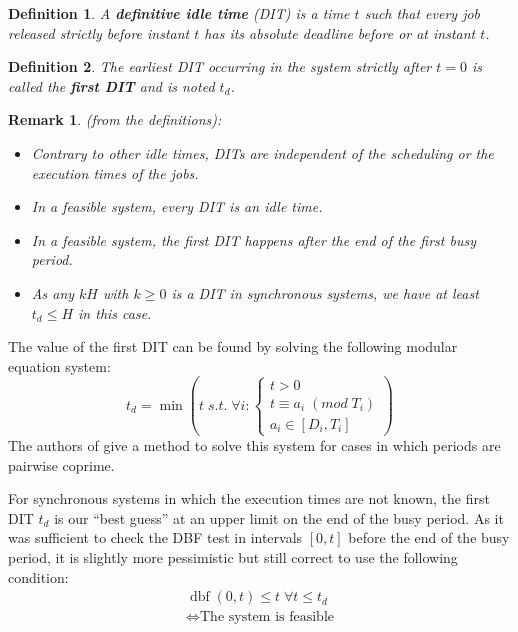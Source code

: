 \documentclass[conference]{IEEEtran}
\newtheorem{definition}{Definition}
\newtheorem{remark}{Remark}
\newcommand{\dbf}[1]{\operatorname{dbf}(#1)}
\begin{document}
  \begin{definition}
    A \textbf{definitive idle time} (DIT) is a time $t$ such that every job
    released strictly before instant $t$ has its absolute deadline before or at instant $t$.
  \end{definition}

  \begin{definition}
    The earliest DIT occurring in the system strictly after $t=0$ is called the
    \textbf{first DIT} and is noted $t_d$.
  \end{definition}

  \begin{remark} (from the definitions):
    \begin{itemize}
      \item Contrary to other idle times, DITs are independent of the
      scheduling or the execution times of the jobs.
      \item In a feasible system, every DIT is an idle time.
      \item In a feasible system, the first DIT happens after the end of the
      first busy period.
      \item As any $kH$ with $k \geqslant 0$ is a DIT in synchronous systems, we have at least $t_d
      \leqslant H$ in this case.
    \end{itemize}
  \end{remark}

  The value of the first DIT can be found by solving the following modular equation system:
  \[
    t_d = \min
    \left( t \; s.t. \; \forall i:
      \left\{
        \begin{array}{c}
          t > 0 \\
          t \equiv a_i \; (mod \; T_i) \\
          a_i \in [D_i, T_i]
        \end{array}
      \right.
    \right)
  \]
  The authors of \cite{george2009characterization} give a method to solve this system for cases in which periods are pairwise coprime.

  For synchronous systems in which the execution times are not known, the first DIT $t_d$
  is our ``best guess'' at an upper limit on the end of the busy period. As it was sufficient
  to check the DBF test in intervals $[0, t]$ before the end of the busy period, it is
  slightly more pessimistic but still correct to use the following condition:
  \[
  	\begin{array}{c}
  		\dbf{0,t} \leqslant t \; \forall t \leqslant t_d \\
  		\iff \text{The system is feasible}
  	\end{array}
  \]
\end{document}
